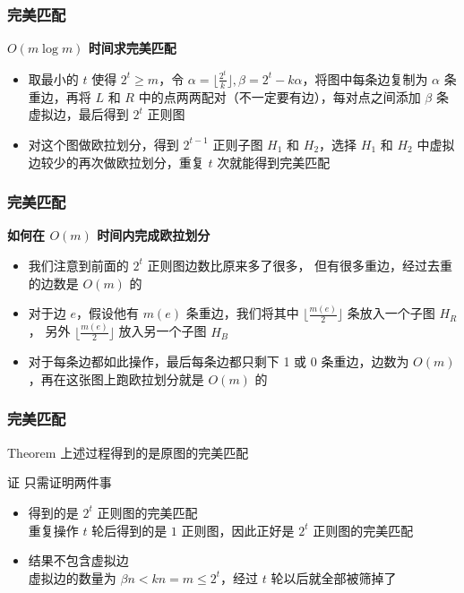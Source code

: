 \documentclass[UTF8]{beamer}
\begin{document}
\begin{frame}
  
  \frametitle{完美匹配}
  \textbf{$O(m \log m)$ 时间求完美匹配}
  \begin{itemize}
    \item 取最小的 $t$ 使得 $2^t \geq m$，令 $\alpha = \lfloor \frac{2^t}{k} \rfloor, \beta = 2^t - k \alpha$，将图中每条边复制为 $\alpha$ 条重边，再将 $L$ 和 $R$ 中的点两两配对（不一定要有边），每对点之间添加 $\beta$ 条虚拟边，最后得到 $2^t$ 正则图
    \item 对这个图做欧拉划分，得到 $2^{t-1}$ 正则子图 $H_1$ 和 $H_2$，选择 $H_1$ 和 $H_2$ 中虚拟边较少的再次做欧拉划分，重复 $t$ 次就能得到完美匹配
  \end{itemize}

\end{frame}


\begin{frame}
  \frametitle{完美匹配}
  \textbf{如何在 $O(m)$ 时间内完成欧拉划分}
  \begin{itemize}
    \item 我们注意到前面的 $2^t$ 正则图边数比原来多了很多，
    但有很多重边，经过去重的边数是 $O(m)$ 的
    \item 对于边 $e$，假设他有 $m(e)$ 条重边，我们将其中 $\lfloor \frac{m(e)}{2} \rfloor$ 条放入一个子图 $H_R$，
    另外 $\lfloor \frac{m(e)}{2} \rfloor$ 放入另一个子图 $H_B$ 
    \item 对于每条边都如此操作，最后每条边都只剩下 1 或 0 条重边，边数为 $O(m)$，再在这张图上跑欧拉划分就是 $O(m)$ 的
  \end{itemize}
\end{frame}

\begin{frame}
  \frametitle{完美匹配}

  \begin{block}{Theorem}
    上述过程得到的是原图的完美匹配
  \end{block}


  \begin{block}{证}
    只需证明两件事
    \begin{itemize}
      \item 得到的是 $2^t$ 正则图的完美匹配
      \\重复操作 $t$ 轮后得到的是 $1$ 正则图，因此正好是 $2^t$ 正则图的完美匹配
      \item 结果不包含虚拟边
      \\ 虚拟边的数量为 $\beta n < k n = m \leq 2^t $，经过 $t$ 轮以后就全部被筛掉了
    \end{itemize}
  \end{block}

\end{frame}
\end{document}
